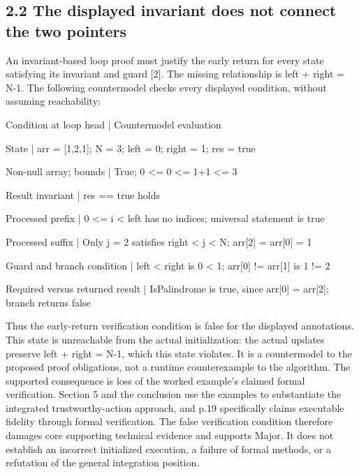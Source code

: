 \documentclass[10pt]{article}
\begin{document}
\subsection*{2.2 The displayed invariant does not connect the two pointers}
An invariant-based loop proof must justify the early return for every state satisfying its invariant and guard [2]. The missing relationship is left + right = N-1. The following countermodel checks every displayed condition, without assuming reachability:\par
Condition at loop head | Countermodel evaluation\par
State | arr = [1,2,1]; N = 3; left = 0; right = 1; res = true\par
Non-null array; bounds | True; 0 <= 0 <= 1+1 <= 3\par
Result invariant | res == true holds\par
Processed prefix | 0 <= i < left has no indices; universal statement is true\par
Processed suffix | Only j = 2 satisfies right < j < N; arr[2] = arr[0] = 1\par
Guard and branch condition | left < right is 0 < 1; arr[0] != arr[1] is 1 != 2\par
Required versus returned result | IsPalindrome is true, since arr[0] = arr[2]; branch returns false\par
Thus the early-return verification condition is false for the displayed annotations. This state is unreachable from the actual initialization: the actual updates preserve left + right = N-1, which this state violates. It is a countermodel to the proposed proof obligations, not a runtime counterexample to the algorithm. The supported consequence is loss of the worked example’s claimed formal verification. Section 5 and the conclusion use the examples to substantiate the integrated trustworthy-action approach, and p.19 specifically claims executable fidelity through formal verification. The false verification condition therefore damages core supporting technical evidence and supports Major. It does not establish an incorrect initialized execution, a failure of formal methods, or a refutation of the general integration position.\par
\end{document}
